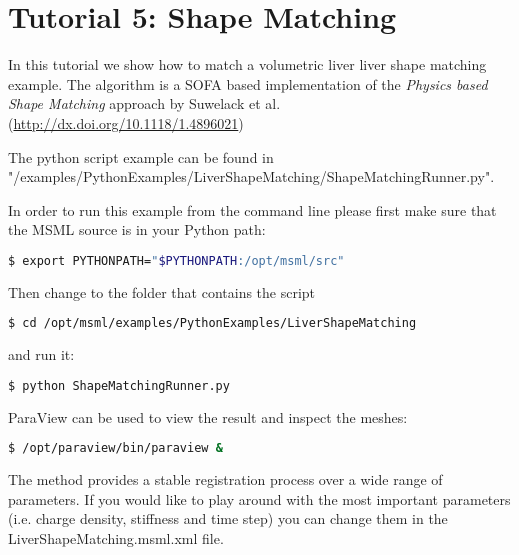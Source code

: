 \chapter{Tutorial 5: Shape Matching}

In this tutorial we show how to match a volumetric liver liver shape matching example. The algorithm is a SOFA based implementation of the \emph{Physics based Shape Matching} approach by Suwelack et al. (\url{http://dx.doi.org/10.1118/1.4896021})

The python script example can be found in "/examples/PythonExamples/LiverShapeMatching/ShapeMatchingRunner.py". 

In order to run this example from the command line please first make sure that the MSML source is in your Python path:
\begin{lstlisting}[language=sh, breaklines=true]
$ export PYTHONPATH="$PYTHONPATH:/opt/msml/src"
\end{lstlisting}

Then change to the folder that contains the script

\begin{lstlisting}[language=sh, breaklines=true]
$ cd /opt/msml/examples/PythonExamples/LiverShapeMatching
\end{lstlisting}

and run it:

\begin{lstlisting}[language=sh, breaklines=true]
$ python ShapeMatchingRunner.py
\end{lstlisting}

ParaView can be used to view the result and inspect the meshes:
\begin{lstlisting}[language=sh, breaklines=true]
$ /opt/paraview/bin/paraview &
\end{lstlisting}

The method provides a stable registration process over a wide range of parameters. If you would like to play around with the most important parameters (i.e. charge density, stiffness and time step) you can change them in the LiverShapeMatching.msml.xml file.
